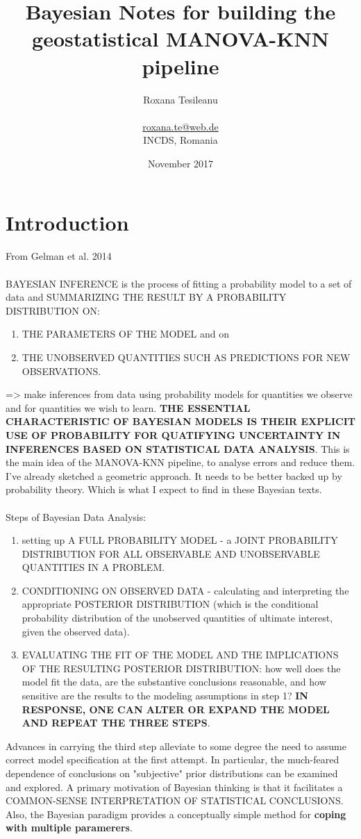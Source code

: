 \documentclass {article}
\title {Bayesian Notes for building the geostatistical MANOVA-KNN pipeline}
\date {November 2017}
\author {Roxana Tesileanu \\
\\
\href{mailto: roxana.te@web.de}{roxana.te@web.de} \\
INCDS, Romania}
\begin{document}
	\maketitle
\tableofcontents

\newpage
{}
\section {Introduction}

From Gelman et al. 2014
\\
\\
BAYESIAN INFERENCE is the process of fitting a probability model to a set of data and SUMMARIZING THE RESULT BY A PROBABILITY DISTRIBUTION ON:
\begin{enumerate}
\item THE PARAMETERS OF THE MODEL and on
\item THE UNOBSERVED QUANTITIES SUCH AS PREDICTIONS FOR NEW OBSERVATIONS.
\end{enumerate} 
=> make inferences from data using probability models for quantities we observe and for quantities we wish to learn. 
\textbf{THE ESSENTIAL CHARACTERISTIC OF BAYESIAN MODELS IS THEIR EXPLICIT USE OF PROBABILITY FOR QUATIFYING UNCERTAINTY IN INFERENCES BASED ON STATISTICAL DATA ANALYSIS}. This is the main idea of the MANOVA-KNN pipeline, to analyse errors and reduce them. I've already sketched a geometric approach. It needs to be better backed up by probability theory. Which is what I expect to find in these Bayesian texts. 
\\
\\ 
Steps of Bayesian Data Analysis:
\begin{enumerate}
\item setting up A FULL PROBABILITY MODEL - a JOINT PROBABILITY DISTRIBUTION FOR ALL OBSERVABLE AND UNOBSERVABLE QUANTITIES IN A PROBLEM. 
\item CONDITIONING ON OBSERVED DATA - calculating and interpreting the appropriate POSTERIOR DISTRIBUTION (which is the conditional probability distribution of the unobserved quantities of ultimate interest, given the observed data). 
\item EVALUATING THE FIT OF THE MODEL AND THE IMPLICATIONS OF THE RESULTING POSTERIOR DISTRIBUTION: how well does the model fit the data, are the substantive conclusions reasonable, and how sensitive are the results to the modeling assumptions in step 1? \textbf{IN RESPONSE, ONE CAN ALTER OR EXPAND THE MODEL AND REPEAT THE THREE STEPS}.
\end{enumerate}
Advances in carrying the third step alleviate to some degree the need to assume correct model specification at the first attempt. In particular, the much-feared dependence of conclusions on "subjective" prior distributions can be examined and explored.
A primary motivation of Bayesian thinking is that it facilitates a COMMON-SENSE INTERPRETATION OF STATISTICAL CONCLUSIONS. 
Also, the Bayesian paradigm provides a conceptually simple method for \textbf{coping with multiple paramerers}.  
\end{document}
